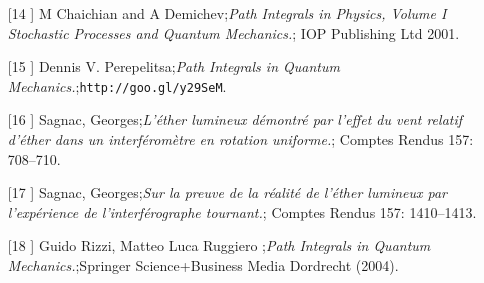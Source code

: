 \begin{itemize}
\item[[14]]  M Chaichian and A Demichev;\textit{Path Integrals in Physics, Volume I
Stochastic Processes and Quantum Mechanics.};  IOP Publishing Ltd 2001.
\item[[15]] Dennis V. Perepelitsa;\textit{Path Integrals in Quantum Mechanics.};\texttt{http://goo.gl/y29SeM}.
\item[[16]] Sagnac, Georges;\textit{L'éther lumineux démontré par l'effet du vent relatif d'éther dans un interféromètre en rotation uniforme.}; Comptes Rendus 157: 708–710.
\item[[17]] Sagnac, Georges;\textit{Sur la preuve de la réalité de l'éther lumineux par l'expérience de l'interférographe tournant.};  Comptes Rendus 157: 1410–1413.
\item[[18]] Guido Rizzi, Matteo Luca Ruggiero ;\textit{Path Integrals in Quantum Mechanics.};Springer Science+Business Media Dordrecht (2004).
\end{itemize}
